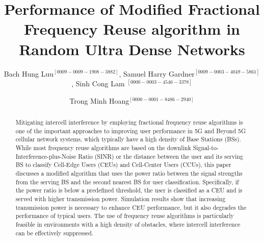 \documentclass{svproc}
\begin{document}
\mainmatter              %
%
\title{Performance of Modified Fractional Frequency Reuse algorithm in Random Ultra Dense Networks}
%
%
\author{Bach Hung Luu$^{[0009-0009-1908-3882]}$, Samuel Harry Gardner$^{[0009-0003-4049-5861]}$, Sinh Cong Lam $^{[0000-0003-4546-3378]}$ \and
	Trong Minh Hoang$^{[0000-0001-8486-2940]}$ }
%
%

\maketitle              %

\begin{abstract}
Mitigating intercell interference by employing fractional frequency reuse algorithms is one of the important approaches to improving user performance in 5G and Beyond 5G cellular network systems, which typically have a high density of Base Stations (BSs). While most frequency reuse algorithms are based on the downlink Signal-to-Interference-plus-Noise Ratio (SINR) or the distance between the user and its serving BS to classify Cell-Edge Users (CEUs) and Cell-Center Users (CCUs), this paper discusses a modified algorithm that uses the power ratio between the signal strengths from the serving BS and the second nearest BS for user classification. Specifically, if the power ratio is below a predefined threshold, the user is classified as a CEU and is served with higher transmission power. Simulation results show that increasing transmission power is necessary to enhance CEU performance, but it also degrades the performance of typical users. The use of frequency reuse algorithms is particularly feasible in environments with a high density of obstacles, where intercell interference can be effectively suppressed.
\end{abstract}
%
\end{document}
